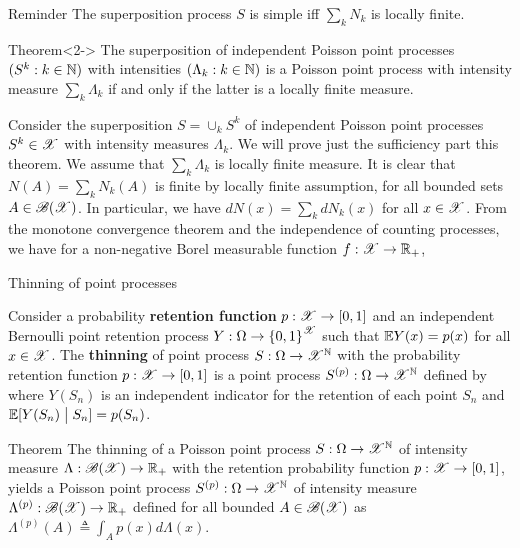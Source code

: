\documentclass[12pt,aspectratio=169]{beamer}
\begin{document}
\begin{frame}
\begin{block}{Reminder}
The superposition process $S$ is simple iff $\sum_kN_k$ is locally finite.  
\end{block}
\begin{block}{Theorem}<2->
The superposition of independent Poisson point processes $(S^k: k \in \mathbb{N})$ with intensities $(\Lambda_k: k \in \mathbb{N})$ 
is a Poisson point process with intensity measure $\sum_k \Lambda_k$ if and only if the latter is a locally finite measure.
\end{block}
\end{frame}

\begin{frame}
\begin{Proof} 
Consider the superposition $S = \cup_kS^k$ of independent Poisson point processes $S^k \in \mathscr{X}$ with intensity measures $\Lambda_k$. 
We will prove just the sufficiency part this theorem. 
We assume that $\sum_k\Lambda_k$ is locally finite measure. 
It is clear that $N(A) = \sum_kN_k(A)$ is finite by locally finite assumption, for all bounded sets $A \in \mathscr{B}(\mathscr{X})$. 
In particular, we have $dN(x) = \sum_kdN_k(x)$ for all $x \in \mathscr{X}$.  
From the monotone convergence theorem and the independence of counting processes, 
we have for a non-negative Borel measurable function $f: \mathscr{X} \to \mathbb{R}_+$, 
\end{Proof}
\end{frame}


\begin{frame}{Thinning of point processes}
\begin{Definition}
Consider a probability \textbf{retention function} $p: \mathscr{X} \to [0,1]$ and an independent Bernoulli point retention process $Y:\Omega \to \left\{0,1\right\}^{\mathscr{X}}$ such that $\mathbb{E} Y(x) = p(x)$ for all $x \in \mathscr{X}$. 
The \textbf{thinning} of point process $S: \Omega \to \mathscr{X}^{\mathbb{N}}$ with the probability retention function $p: \mathscr{X} \to [0,1]$ is a point process  $S^{(p)}: \Omega \to \mathscr{X}^{\mathbb{N}}$ defined by  
where $Y(S_n)$ is an independent indicator for the retention of each point $S_n$ and $\mathbb{E}[Y(S_n)\; \big\vert \; S_n] = p(S_n)$. 
\end{Definition}
\end{frame}

\begin{frame}
\begin{block}{Theorem}
The thinning of a Poisson point process $S:\Omega\to\mathscr{X}^{\mathbb{N}}$ of intensity measure $\Lambda:\mathscr{B}(\mathscr{X})\to\mathbb{R}_+$ with the retention probability function $p:\mathscr{X}\to[0,1]$,  
yields a Poisson point process $S^{(p)}:\Omega\to\mathscr{X}^{\mathbb{N}}$ of intensity measure $\Lambda^{(p)}:\mathscr{B}(\mathscr{X})\to\mathbb{R}_+$ defined for all bounded $A \in \mathscr{B}(\mathscr{X})$ as 
$
\Lambda^{(p)}(A) \triangleq \int_A p(x) d\Lambda(x).
$
\end{block}
\end{frame}
\end{document}
